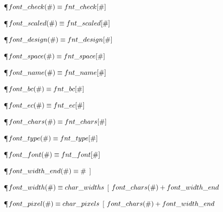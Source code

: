 \Y\P\D {}$\\{font\_check}(\#)\S\\{fnt\_check}[\#]$\par
\P\D {}$\\{font\_scaled}(\#)\S\\{fnt\_scaled}[\#]$\par
\P\D {}$\\{font\_design}(\#)\S\\{fnt\_design}[\#]$\par
\P\D {}$\\{font\_space}(\#)\S\\{fnt\_space}[\#]$\par
\P\D {}$\\{font\_name}(\#)\S\\{fnt\_name}[\#]$\par
\P\D {}$\\{font\_bc}(\#)\S\\{fnt\_bc}[\#]$\par
\P\D {}$\\{font\_ec}(\#)\S\\{fnt\_ec}[\#]$\par
\P\D {}$\\{font\_chars}(\#)\S\\{fnt\_chars}[\#]$\par
\P\D {}$\\{font\_type}(\#)\S\\{fnt\_type}[\#]$\par
\P\D {}$\\{font\_font}(\#)\S\\{fnt\_font}[\#]$\Y\par
\P\D {}$\\{font\_width\_end}(\#)\S\#$ ] \par
\P\D $\\{font\_width}(\#)\S\\{char\_widths}$ [ $\\{font\_chars}(\#)+\\{font%
\_width\_end}$\par
\P\D $\\{font\_pixel}(\#)\S\\{char\_pixels}$ [ $\\{font\_chars}(\#)+\\{font%
\_width\_end}$\par
